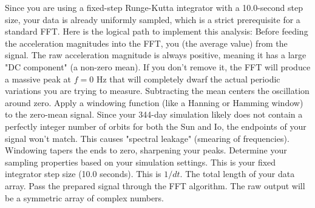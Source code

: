 {}Since you are using a fixed-step Runge-Kutta integrator with a 10.0-second step size, your data is already uniformly sampled, which is a strict prerequisite for a standard FFT.\markdownRendererInterblockSeparator
{}Here is the logical path to implement this analysis:\markdownRendererInterblockSeparator
{}\markdownRendererSectionBegin
{}\markdownRendererInterblockSeparator
{}Before feeding the acceleration magnitudes into the FFT, you  (the average value) from the signal.\markdownRendererInterblockSeparator
{}\markdownRendererUlBegin
\markdownRendererUlItem {} The raw acceleration magnitude is always positive, meaning it has a large "DC component" (a non-zero mean). If you don't remove it, the FFT will produce a massive peak at $f = 0$ Hz that will completely dwarf the actual periodic variations you are trying to measure. Subtracting the mean centers the oscillation around zero.\markdownRendererUlItemEnd 
\markdownRendererUlItem {} Apply a windowing function (like a Hanning or Hamming window) to the zero-mean signal. Since your 344-day simulation likely does not contain a perfectly integer number of orbits for both the Sun and Io, the endpoints of your signal won't match. This causes "spectral leakage" (smearing of frequencies). Windowing tapers the ends to zero, sharpening your peaks.\markdownRendererUlItemEnd 
\markdownRendererUlEnd \markdownRendererInterblockSeparator
{}
\markdownRendererSectionEnd \markdownRendererSectionBegin
{}\markdownRendererInterblockSeparator
{}Determine your sampling properties based on your simulation settings.\markdownRendererInterblockSeparator
{}\markdownRendererUlBegin
\markdownRendererUlItem {} This is your fixed integrator step size (10.0 seconds).\markdownRendererUlItemEnd 
\markdownRendererUlItem {} This is $1 / dt$.\markdownRendererUlItemEnd 
\markdownRendererUlItem {} The total length of your data array.\markdownRendererUlItemEnd 
\markdownRendererUlEnd \markdownRendererInterblockSeparator
{}
\markdownRendererSectionEnd \markdownRendererSectionBegin
{}\markdownRendererInterblockSeparator
{}Pass the prepared signal through the FFT algorithm. The raw output will be a symmetric array of complex numbers.\markdownRendererInterblockSeparator
